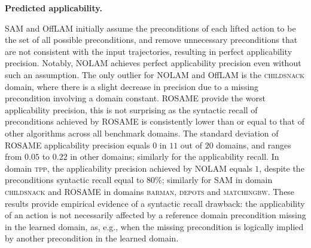 \documentclass[letterpaper]{article} %
\newcommand{\nolam}{NOLAM\xspace}
\newcommand{\offlam}{OffLAM\xspace}
\newcommand{\rosame}{ROSAME\xspace}
\newcommand{\samshort}{SAM\xspace}
\newcommand{\miniparagraph}[1]{\textbf{#1.}}
\newif\ifaddcomments
\newcommand{\roni}[1]{\ifaddcomments{\textcolor{red}{[Roni: #1]}}\fi}
\newcommand{\leo}[1]{\ifaddcomments{\textcolor{pink}{[Leonardo: #1]}}\fi}
\begin{document}
\miniparagraph{Predicted applicability} 
%

%
\samshort and \offlam initially assume the preconditions of each lifted action to be the set of all possible preconditions, and remove unnecessary preconditions that are not consistent with the input trajectories, resulting in perfect applicability precision. Notably, \nolam{} achieves perfect applicability precision even without such an assumption.
The only outlier for \nolam{} and \offlam{} is the \textsc{childsnack} domain, where there is a slight decrease in precision due to a missing precondition involving a domain constant.
\rosame provide the worst applicability precision, this is not surprising as the syntactic recall of preconditions achieved by \rosame{} is consistently lower than or equal to that of other algorithms across all benchmark domains.
The standard deviation of \rosame applicability precision equals $0$ in $11$ out of $20$ domains, and ranges from $0.05$ to $0.22$ in other domains; similarly for the applicability recall.
%
In domain \textsc{tpp}, the applicability precision achieved by \nolam equals $1$, despite the preconditions syntactic recall equal to $80\%$; similarly for \samshort in domain \textsc{childsnack} and \rosame in domains \textsc{barman}, \textsc{depots} and \textsc{matchingbw}. These results provide empirical evidence of a syntactic recall drawback: the applicability of an action is not necessarily affected by a reference domain precondition missing in the learned domain, as, e.g., when the missing precondition is logically implied by another precondition in the learned domain. 

\end{document}
